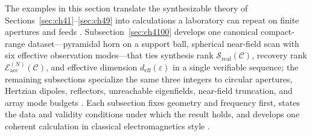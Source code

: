 The examples in this section translate the synthesizable theory of Sections~\ref{sec:ch41}--\ref{sec:ch49} into calculations a laboratory can repeat on finite apertures and feeds \cite{stratton1941}. Subsection~\ref{sec:ch4100} develops one canonical compact-range dataset---pyramidal horn on a support ball, spherical near-field scan with six effective observation modes---that ties synthesis rank $\mathcal{S}_{\mathrm{real}}(\mathcal{C})$, recovery rank $\mathcal{E}_{\mathrm{acc}}^{(N)}(\mathcal{C})$, and effective dimension $d_{\mathrm{eff}}(\varepsilon)$ in a single verifiable sequence; the remaining subsections specialize the same three integers to circular apertures, Hertzian dipoles, reflectors, unreachable eigenfields, near-field truncation, and array mode budgets \cite{jackson1999}. Each subsection fixes geometry and frequency first, states the data and validity conditions under which the result holds, and develops one coherent calculation in classical electromagnetics style \cite{collin2001}.
